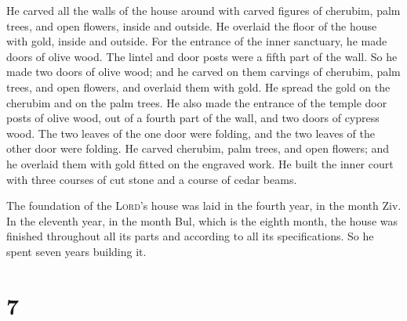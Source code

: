  He carved all the walls of the house around with carved
figures of cherubim, palm trees, and open flowers, inside and outside.
 He overlaid the floor of the house with gold, inside and
outside.  For the entrance of the inner sanctuary, he
made doors of olive wood. The lintel and door posts were a fifth part of
the wall.  So he made two doors of olive wood; and he
carved on them carvings of cherubim, palm trees, and open flowers, and
overlaid them with gold. He spread the gold on the cherubim and on the
palm trees.  He also made the entrance of the temple door
posts of olive wood, out of a fourth part of the wall, 
and two doors of cypress wood. The two leaves of the one door were
folding, and the two leaves of the other door were folding.
 He carved cherubim, palm trees, and open flowers; and he
overlaid them with gold fitted on the engraved work.  He
built the inner court with three courses of cut stone and a course of
cedar beams.

 The foundation of the \textsc{Lord}'s house was laid in
the fourth year, in the month Ziv.  In the eleventh year,
in the month Bul, which is the eighth month, the house was finished
throughout all its parts and according to all its specifications. So he
spent seven years building it.

\hypertarget{section-6}{%
\section{7}\label{section-6}}

